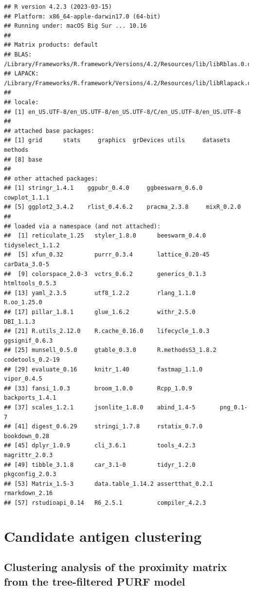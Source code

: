 \documentclass[
  11pt,
  oneside]{book}
\begin{document}
\begin{verbatim}
## R version 4.2.3 (2023-03-15)
## Platform: x86_64-apple-darwin17.0 (64-bit)
## Running under: macOS Big Sur ... 10.16
## 
## Matrix products: default
## BLAS:   /Library/Frameworks/R.framework/Versions/4.2/Resources/lib/libRblas.0.dylib
## LAPACK: /Library/Frameworks/R.framework/Versions/4.2/Resources/lib/libRlapack.dylib
## 
## locale:
## [1] en_US.UTF-8/en_US.UTF-8/en_US.UTF-8/C/en_US.UTF-8/en_US.UTF-8
## 
## attached base packages:
## [1] grid      stats     graphics  grDevices utils     datasets  methods  
## [8] base     
## 
## other attached packages:
## [1] stringr_1.4.1    ggpubr_0.4.0     ggbeeswarm_0.6.0 cowplot_1.1.1   
## [5] ggplot2_3.4.2    rlist_0.4.6.2    pracma_2.3.8     mixR_0.2.0      
## 
## loaded via a namespace (and not attached):
##  [1] reticulate_1.25   styler_1.8.0      beeswarm_0.4.0    tidyselect_1.1.2 
##  [5] xfun_0.32         purrr_0.3.4       lattice_0.20-45   carData_3.0-5    
##  [9] colorspace_2.0-3  vctrs_0.6.2       generics_0.1.3    htmltools_0.5.3  
## [13] yaml_2.3.5        utf8_1.2.2        rlang_1.1.0       R.oo_1.25.0      
## [17] pillar_1.8.1      glue_1.6.2        withr_2.5.0       DBI_1.1.3        
## [21] R.utils_2.12.0    R.cache_0.16.0    lifecycle_1.0.3   ggsignif_0.6.3   
## [25] munsell_0.5.0     gtable_0.3.0      R.methodsS3_1.8.2 codetools_0.2-19 
## [29] evaluate_0.16     knitr_1.40        fastmap_1.1.0     vipor_0.4.5      
## [33] fansi_1.0.3       broom_1.0.0       Rcpp_1.0.9        backports_1.4.1  
## [37] scales_1.2.1      jsonlite_1.8.0    abind_1.4-5       png_0.1-7        
## [41] digest_0.6.29     stringi_1.7.8     rstatix_0.7.0     bookdown_0.28    
## [45] dplyr_1.0.9       cli_3.6.1         tools_4.2.3       magrittr_2.0.3   
## [49] tibble_3.1.8      car_3.1-0         tidyr_1.2.0       pkgconfig_2.0.3  
## [53] Matrix_1.5-3      data.table_1.14.2 assertthat_0.2.1  rmarkdown_2.16   
## [57] rstudioapi_0.14   R6_2.5.1          compiler_4.2.3
\end{verbatim}

\hypertarget{04_candidate_antigen_clustering}{%
\chapter{Candidate antigen clustering}\label{04_candidate_antigen_clustering}}

\hypertarget{clustering-analysis-of-the-proximity-matrix-from-the-tree-filtered-purf-model}{%
\section{Clustering analysis of the proximity matrix from the tree-filtered PURF model}\label{clustering-analysis-of-the-proximity-matrix-from-the-tree-filtered-purf-model}}
\end{document}
